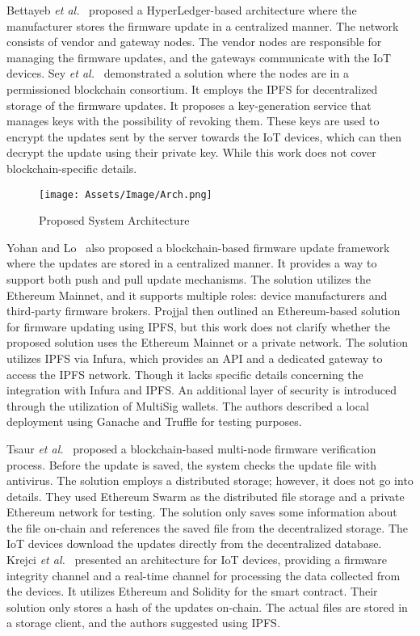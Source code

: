 \documentclass[conference]{IEEEtran}
\begin{document}
Bettayeb \emph{et al.}~\cite{Bettayeb2021} proposed a HyperLedger-based architecture where the manufacturer stores the firmware update in a centralized manner. The network consists of vendor and gateway nodes. The vendor nodes are responsible for managing the firmware updates, and the gateways communicate with the IoT devices. Sey \emph{et al.}~\cite{Sey2021} demonstrated a solution where the nodes are in a permissioned blockchain consortium. It employs the IPFS for decentralized storage of the firmware updates. It proposes a key-generation service that manages keys with the possibility of revoking them. These keys are used to encrypt the updates sent by the server towards the IoT devices, which can then decrypt the update using their private key. While this work does not cover blockchain-specific details.

\begin{figure*}[t]
\centering
\texttt{[image: Assets/Image/Arch.png]}
\caption{Proposed System Architecture}
\label{fig:Arch}
\vspace{-2mm}
\end{figure*}


Yohan and Lo~\cite{Yohan2020} also proposed a blockchain-based firmware update framework where the updates are stored in a centralized manner. It provides a way to support both push and pull update mechanisms. The solution utilizes the Ethereum Mainnet, and it supports multiple roles: device manufacturers and third-party firmware brokers. %
Projjal \cite{Projjal2020} then outlined an Ethereum-based solution for firmware updating using IPFS, but this work does not clarify whether the proposed solution uses the Ethereum Mainnet or a private network. The solution utilizes IPFS via Infura, which provides an API and a dedicated gateway to access the IPFS network. Though it lacks specific details concerning the integration with Infura and IPFS. An additional layer of security is introduced through the utilization of MultiSig wallets. The authors described a local deployment using Ganache and Truffle for testing purposes.

Tsaur \emph{et al.}~\cite{Tsaur2020} proposed a blockchain-based multi-node firmware verification process. Before the update is saved, the system checks the update file with antivirus. The solution employs a distributed storage; however, it does not go into details. They used Ethereum Swarm as the distributed file storage and a private Ethereum network for testing. The solution only saves some information about the file on-chain and references the saved file from the decentralized storage. The IoT devices download the updates directly from the decentralized database.
Krejci \emph{et al.}~\cite{Krejci2020} presented an architecture for IoT devices, providing a firmware integrity channel and a real-time channel for processing the data collected from the devices. It utilizes Ethereum and Solidity for the smart contract. Their solution only stores a hash of the updates on-chain. The actual files are stored in a storage client, and the authors suggested using IPFS.
\end{document}
